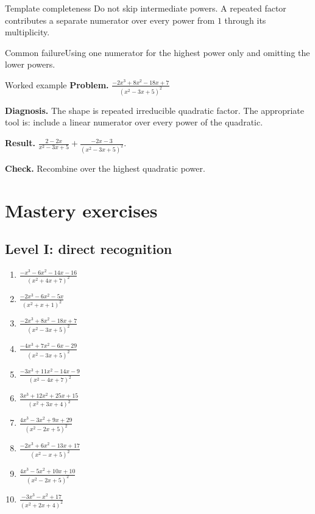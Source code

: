 \documentclass[11pt,oneside]{book}
\begin{document}
\begin{warningbox}{Template completeness}
Do not skip intermediate powers. A repeated factor contributes a separate numerator over every power from $1$ through its multiplicity.
\end{warningbox}
\begin{warningbox}{Common failure}Using one numerator for the highest power only and omitting the lower powers.\end{warningbox}
\begin{examplebox}{Worked example}
\textbf{Problem.} $\displaystyle \frac{- 2 x^{3} + 8 x^{2} - 18 x + 7}{\left(x^{2} - 3 x + 5\right)^{2}}$

\textbf{Diagnosis.} The shape is repeated irreducible quadratic factor. The appropriate tool is: include a linear numerator over every power of the quadratic.

\textbf{Result.} $\displaystyle \frac{2 - 2 x}{x^{2} - 3 x + 5} + \frac{- 2 x - 3}{\left(x^{2} - 3 x + 5\right)^{2}}$.

\textbf{Check.} Recombine over the highest quadratic power.
\end{examplebox}
\section{Mastery exercises}
\subsection*{Level I: direct recognition}
\begin{enumerate}[leftmargin=*,label=\textbf{\arabic*.},itemsep=0.65\baselineskip]
\item $\displaystyle \frac{- x^{3} - 6 x^{2} - 14 x - 16}{\left(x^{2} + 4 x + 7\right)^{2}}$
\item $\displaystyle \frac{- 2 x^{3} - 6 x^{2} - 5 x}{\left(x^{2} + x + 1\right)^{2}}$
\item $\displaystyle \frac{- 2 x^{3} + 8 x^{2} - 18 x + 7}{\left(x^{2} - 3 x + 5\right)^{2}}$
\item $\displaystyle \frac{- 4 x^{3} + 7 x^{2} - 6 x - 29}{\left(x^{2} - 3 x + 5\right)^{2}}$
\item $\displaystyle \frac{- 3 x^{3} + 11 x^{2} - 14 x - 9}{\left(x^{2} - 4 x + 7\right)^{2}}$
\item $\displaystyle \frac{3 x^{3} + 12 x^{2} + 25 x + 15}{\left(x^{2} + 3 x + 4\right)^{2}}$
\item $\displaystyle \frac{4 x^{3} - 3 x^{2} + 9 x + 29}{\left(x^{2} - 2 x + 5\right)^{2}}$
\item $\displaystyle \frac{- 2 x^{3} + 6 x^{2} - 13 x + 17}{\left(x^{2} - x + 5\right)^{2}}$
\item $\displaystyle \frac{4 x^{3} - 5 x^{2} + 10 x + 10}{\left(x^{2} - 2 x + 5\right)^{2}}$
\item $\displaystyle \frac{- 3 x^{3} - x^{2} + 17}{\left(x^{2} + 2 x + 4\right)^{2}}$
\end{enumerate}
\end{document}
